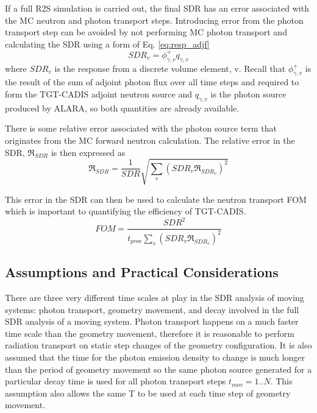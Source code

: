 If a full R2S simulation is carried out, the final SDR has an error associated
with the MC neutron and photon transport steps.  Introducing error from the photon transport
step can be avoided by not performing MC photon transport and calculating the
SDR using a form of Eq. \ref{eq:resp_adjf}
\begin{equation}\label{eq:resp_v}
	SDR_v = \phi_{\gamma, v}^{+} q_{\gamma, v}
\end{equation}
where $SDR_v$ is the response from a discrete volume element, v.
Recall that $\phi_{\gamma, v}^{+}$ is the result of the sum of adjoint photon flux 
over all time steps and required to form the TGT-CADIS adjoint neutron source
and $q_{\gamma, v}$ is the photon source produced by ALARA, so both quantities
are already available.

There is some relative error associated with the photon source term that
originates from the MC forward neutron calculation.  
The relative error in the
SDR, $\Re_{SDR}$ is then expressed as 
\begin{equation}\label{eq:err}
	\Re_{SDR} = \frac{1}{SDR} \sqrt{\sum_v{(SDR_v \Re_{SDR_v})^2}}
\end{equation}

This error in the SDR can then be used to calculate the neutron transport
FOM \cite{eb_prelim}
which is important to quantifying the efficiency of TGT-CADIS.
\begin{equation}\label{eq:fom}
	FOM = \frac{SDR^2}{t_{proc}\sum_v{(SDR_v \Re_{SDR_v})^2}}
\end{equation}




\subsection{Assumptions and Practical Considerations}
There are three very different time scales at play in the SDR analysis of 
moving systems: photon transport,
geometry movement, and decay involved in the full SDR analysis of a moving
system.  Photon transport happens on a much
faster time scale than the geometry movement, therefore it is reasonable to
perform radiation transport on static step changes of the geometry
configuration.  It is also assumed that the
time for the photon emission density to change is much longer than the
period of geometry movement %
so the same photon source generated for a particular decay time
is used for all photon transport steps $t_{mov} = 1..N$.
This assumption also allows the same T to be used at each time step of geometry movement.

